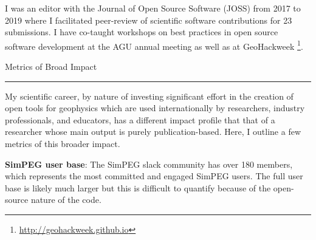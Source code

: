 \documentclass[a4paper, 11pt]{article}
\newcommand{\heading}[1]{
    \begin{minipage}[t]{\textwidth}
    \vspace{0.1cm}
    {\LARGE #1}\\
    \vspace{-0.24cm}
    \hrule
    \end{minipage}
    \vspace{0.05cm}

}
\begin{document}
I was an editor with the Journal of Open Source Software (JOSS) from 2017 to 2019 where I facilitated peer-review of scientific software contributions for 23 submissions. I have co-taught workshops on best practices in open source software development at the AGU annual meeting as well as at GeoHackweek
\footnote{\href{http://geohackweek.github.io}{http://geohackweek.github.io}}.



\heading{Metrics of Broad Impact}

My scientific career, by nature of investing significant effort in the creation of open tools for geophysics which are used internationally by researchers, industry professionals, and educators, has a different impact profile that that of a researcher whose main output is purely publication-based. Here, I outline a few metrics of this broader impact. \vspace{0.3cm}

\textbf{SimPEG user base}: The SimPEG slack community has over 180 members, which represents the most committed and engaged SimPEG users. The full user base is likely much larger but this is difficult to quantify because of the open-source nature of the code. \vspace{0.3cm}

\end{document}
